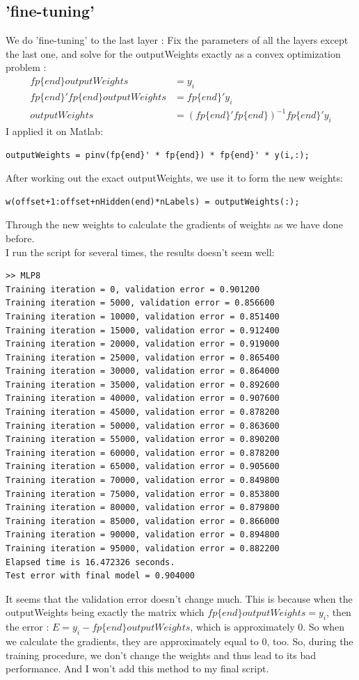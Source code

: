 \documentclass[12pt]{article}
\begin{document}
\subsection{'fine-tuning'}
We do 'fine-tuning' to the last layer : Fix the parameters of all the layers except the last one, and solve for the outputWeights exactly as a convex optimization problem :
\begin{align*}
fp\{end\} outputWeights &= y_i\\
fp\{end\}' fp\{end\} outputWeights &=fp\{end\}' y_i\\
outputWeights &= (fp\{end\}' fp\{end\})^{-1} fp\{end\}' y_i
\end{align*}
I applied it on Matlab:
\begin{lstlisting}
outputWeights = pinv(fp{end}' * fp{end}) * fp{end}' * y(i,:);
\end{lstlisting}
After working out the exact outputWeights, we use it to form the new weights:
\begin{lstlisting}
w(offset+1:offset+nHidden(end)*nLabels) = outputWeights(:);
\end{lstlisting}
Through the new weights to calculate the gradients of weights as we have done before.\\
I run the script for several times, the results doesn't seem well:
\begin{lstlisting}
>> MLP8
Training iteration = 0, validation error = 0.901200
Training iteration = 5000, validation error = 0.856600
Training iteration = 10000, validation error = 0.851400
Training iteration = 15000, validation error = 0.912400
Training iteration = 20000, validation error = 0.919000
Training iteration = 25000, validation error = 0.865400
Training iteration = 30000, validation error = 0.864000
Training iteration = 35000, validation error = 0.892600
Training iteration = 40000, validation error = 0.907600
Training iteration = 45000, validation error = 0.878200
Training iteration = 50000, validation error = 0.863600
Training iteration = 55000, validation error = 0.890200
Training iteration = 60000, validation error = 0.878200
Training iteration = 65000, validation error = 0.905600
Training iteration = 70000, validation error = 0.849800
Training iteration = 75000, validation error = 0.853800
Training iteration = 80000, validation error = 0.879800
Training iteration = 85000, validation error = 0.866000
Training iteration = 90000, validation error = 0.894800
Training iteration = 95000, validation error = 0.882200
Elapsed time is 16.472326 seconds.
Test error with final model = 0.904000
\end{lstlisting}
It seems that the validation error doesn't change much. This is because when the outputWeights being exactly the matrix which $fp\{end\} outputWeights = y_i$, then the error : $E = y_i - fp\{end\} outputWeights$, which is approximately 0. So when we calculate the gradients, they are approximately equal to 0, too. So, during the training procedure, we don't change the weights and thus lead to its bad performance. And I won't add this method to my final script.
\end{document}
